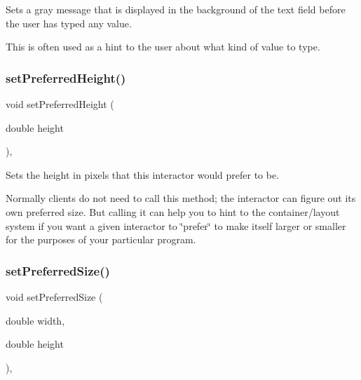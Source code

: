Sets a gray message that is displayed in the background of the text field before the user has typed any value. 

This is often used as a hint to the user about what kind of value to type. \mbox{\label{classGInteractor_a1ab987704fce32098706c6f00fb08218}} 
\subsubsection{\texorpdfstring{set\+Preferred\+Height()}{setPreferredHeight()}}
{\footnotesize\ttfamily void set\+Preferred\+Height (\begin{DoxyParamCaption}\item[{double}]{height }\end{DoxyParamCaption})\hspace{0.3cm}{\ttfamily [virtual]}, {\ttfamily [inherited]}}



Sets the height in pixels that this interactor would prefer to be. 

Normally clients do not need to call this method; the interactor can figure out its own preferred size. But calling it can help you to hint to the container/layout system if you want a given interactor to \char`\"{}prefer\char`\"{} to make itself larger or smaller for the purposes of your particular program. \mbox{\label{classGInteractor_a042c5ae19430d765ef552371cae3632c}} 
\subsubsection{\texorpdfstring{set\+Preferred\+Size()}{setPreferredSize()}\hspace{0.1cm}{\footnotesize\ttfamily [1/2]}}
{\footnotesize\ttfamily void set\+Preferred\+Size (\begin{DoxyParamCaption}\item[{double}]{width,  }\item[{double}]{height }\end{DoxyParamCaption})\hspace{0.3cm}{\ttfamily [virtual]}, {\ttfamily [inherited]}}



